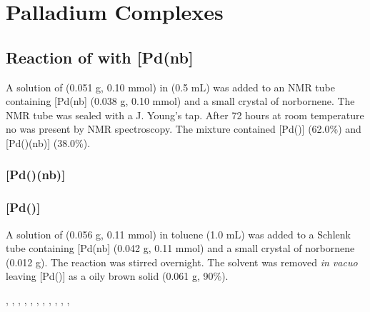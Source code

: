 \section{Palladium Complexes}
\label{section:experimental:palladium}

\subsection*{Reaction of \tButhixantphos{} with [Pd(nb]}

A solution of \tButhixantphos{} (0.051 g, 0.10 mmol) in  (0.5 mL) was added to an NMR tube containing [Pd(nb] (0.038 g, 0.10 mmol) and a small crystal of norbornene.  The NMR tube was sealed with a J. Young's tap.  After 72 hours at room temperature no \tButhixantphos{} was present by \phosphorus{} NMR spectroscopy.  The mixture contained [Pd(\tButhixantphos)] (62.0\%) and [Pd(\tButhixantphos)(nb)] (38.0\%).  

\subsubsection{[Pd(\tButhixantphos)(nb)]}


\subsubsection{[Pd(\tButhixantphos)]}


A solution of \tButhixantphos{} (0.056 g, 0.11 mmol) in toluene (1.0 mL) was added to a Schlenk tube containing [Pd(nb] (0.042 g, 0.11 mmol) and a small crystal of norbornene (0.012 g).  The reaction was stirred overnight.  The solvent was removed \emph{in vacuo} leaving [Pd(\tButhixantphos)] as a oily brown solid (0.061 g, 90\%).

,
,
,
,
,
,
,
,
,
,
,

